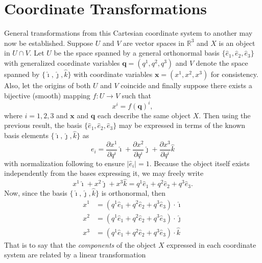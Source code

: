 \documentclass[11pt,dvipsnames]{thesis}
\begin{document}
\section{Coordinate Transformations}
General transformations from this Cartesian coordinate system to another may now be established. Suppose $U$ and $V$ are vector spaces in $\mathbb{R}^3$ and $X$ is an object in $U \cap V$. Let $U$ be the space spanned by a general orthonormal basis $\{\hat{e}_1, \hat{e}_2, \hat{e}_3\}$ with generalized coordinate variables $\mathbf{q} = (q^1, q^2, q^3)$ and $V$ denote the space spanned by $\{\hat{\imath}, \hat{\jmath}, \hat{k}\}$ with coordinate variables $\mathbf{x} = (x^1, x^2, x^3)$ for consistency. Also, let the origins of both $U$ and $V$ coincide and finally suppose there exists a bijective (smooth) mapping $f : U \to V$ such that
\begin{equation}
x^i = f(\mathbf{q})^i,
\end{equation}
where $i = 1, 2, 3$ and $\mathbf{x}$ and $\mathbf{q}$ each describe the same object $X$. Then using the previous result, the basis $\{\hat{e}_1, \hat{e}_2, \hat{e}_3\}$ may be expressed in terms of the known basis elements $\{\hat{\imath}, \hat{\jmath}, \hat{k}\}$ as
\begin{equation}
e_i = \frac{\partial x^1}{\partial q^i} \hat{\imath} + \frac{\partial x^2}{\partial q^i} \hat{\jmath} + \frac{\partial x^3}{\partial q^i} \hat{k} \label{eq:BasisTransform}
\end{equation}
with normalization following to ensure $|\hat{e}_i| = 1$.
Because the object itself exists independently from the bases expressing it, we may freely write
\begin{equation}
x^1 \hat{\imath} + x^2 \hat{\jmath} + x^3 \hat{k} = q^1 \hat{e}_1 + q^2 \hat{e}_2 + q^3 \hat{e}_3.
\end{equation}
Now, since the basis $\{\hat{\imath}, \hat{\jmath}, \hat{k}\}$ is orthonormal, then
\begin{align}
x^1 &= (q^1 \hat{e}_1 + q^2 \hat{e}_2 + q^3 \hat{e}_3) \cdot \hat{\imath} \\
x^2 &= (q^1 \hat{e}_1 + q^2 \hat{e}_2 + q^3 \hat{e}_3) \cdot \hat{\jmath} \\
x^3 &= (q^1 \hat{e}_1 + q^2 \hat{e}_2 + q^3 \hat{e}_3) \cdot \hat{k}
\end{align}
That is to say that the \textit{components} of the object $X$ expressed in each coordinate system are related by a linear transformation
\end{document}

